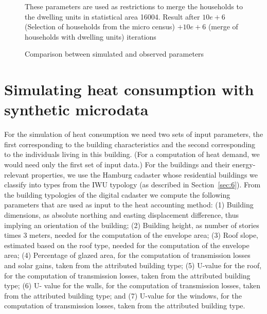 \documentclass[11pt]{IJM-article}
\begin{document}
\begin{figure}[htb]
    \centering 
    \caption{Comparison between simulated and observed parameters}\label{fig:6} 
    
    \begin{flushleft}
    \begin{footnotesize}
    These parameters are used as restrictions to merge the households to the
    dwelling units in statistical area 16004.  Result after $10e+6$ (Selection
    of households from the micro census) $+ 10e+6$ (merge of households with
    dwelling units) iterations
    \end{footnotesize}
    \end{flushleft}
\end{figure}

\section{Simulating heat consumption with synthetic microdata}\label{sec:8}

For the simulation of heat consumption we need two sets of input parameters,
the first corresponding to the building characteristics and the second
corresponding to the individuals living in this building. (For a computation of
heat demand, we would need only the first set of input data.) For the buildings
and their energy-relevant properties, we use the Hamburg cadaster whose
residential buildings we classify into types from the IWU typology (as
described in Section~\ref{sec:6}). From the building typologies of the digital
cadaster we compute the following parameters that are used as input to the heat
accounting method: (1) Building dimensions, as absolute northing and easting
displacement difference, thus implying an orientation of the building; (2)
Building height, as number of stories times 3 meters, needed for the
computation of the envelope area; (3) Roof slope, estimated based on the roof
type, needed for the computation of the envelope area; (4) Percentage of glazed
area, for the computation of transmission losses and solar gains, taken from
the attributed building type; (5) U-value for the roof, for the computation of
transmission losses, taken from the attributed building type; (6) U- value for
the walls, for the computation of transmission losses, taken from the
attributed building type; and (7) U-value for the windows, for the computation
of transmission losses, taken from the attributed building type.\\
\end{document}
